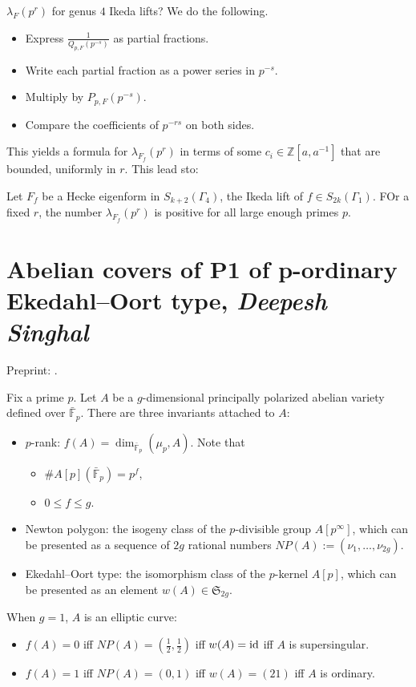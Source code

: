 \documentclass[reqno]{amsart} 
\begin{document}
$\lambda_F(p^r)$ for genus $4$ Ikeda lifts?  We do the following.
\begin{itemize}
\item Express $\frac{1}{Q_{p, F}(p^{- s})}$ as partial fractions.
\item Write each partial fraction as a power series in $p^{- s}$.
\item Multiply by $P_{p, F}(p^{- s})$.
\item Compare the coefficients of $p^{- r s}$ on both sides.
\end{itemize}
This yields a formula for $\lambda_{F_f}(p^r)$ in terms of some $c_i \in \mathbb{Z}[a, a^{-1}]$ that are bounded, uniformly in $r$.  This lead sto:
\begin{theorem}[A, 2024]
  Let $F_f$ be a Hecke eigenform in $S_{k + 2}(\Gamma_4)$, the Ikeda lift of $f \in S_{2 k}(\Gamma_1)$.  FOr a fixed $r$, the number $\lambda_{F_f}(p^r)$ is positive for all large enough primes $p$.
\end{theorem}


\section{Abelian covers of P1 of p-ordinary Ekedahl--Oort type, \textnormal{\emph{Deepesh Singhal }}}

Preprint: \cite{2023arXiv2303.13350}.

Fix a prime $p$.  Let $A$ be a $g$-dimensional principally polarized abelian variety defined over $\bar{\mathbb{F}}_p$.  There are three invariants attached to $A$:
\begin{itemize}
\item $p$-rank: $f(A) = \dim_{\bar{\mathbb{F}}_p}(\mu_p, A)$.  Note that
  \begin{itemize}
  \item $\# A[p](\bar{\mathbb{F}}_p) = p^f$,
  \item $0 \leq f \leq g$.
  \end{itemize}
\item Newton polygon: the isogeny class of the $p$-divisible group $A[p^\infty]$, which can be presented as a sequence of $2 g$ rational numbers $N P(A) :=(\nu_1, \dotsc, \nu_{2 g})$.
\item Ekedahl--Oort type: the isomorphism class of the $p$-kernel $A[p]$, which can be presented as an element $w(A) \in \mathfrak{S}_{2 g}$.
\end{itemize}

When $g =1$, $A$ is an elliptic curve:
\begin{itemize}
\item $f(A) = 0$ iff $N P(A) =(\tfrac{1}{2}, \tfrac{1}{2})$ iff $w(A) = \operatorname{id}$ iff $A$ is supersingular.
\item $f(A) = 1$ iff $N P(A) =(0, 1)$ iff $w(A) =(21)$ iff $A$ is ordinary.
\end{itemize}
\end{document}
